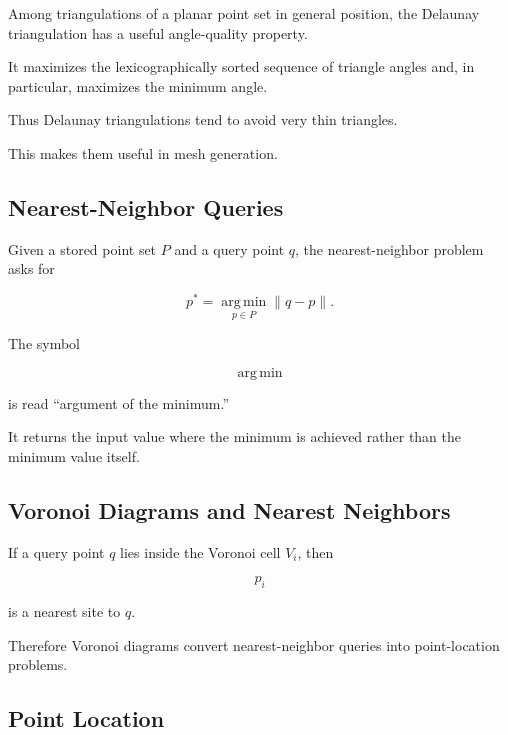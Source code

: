 Among triangulations of a planar point set in general position, the Delaunay
triangulation has a useful angle-quality property.

It maximizes the lexicographically sorted sequence of triangle angles and,
in particular, maximizes the minimum angle.

Thus Delaunay triangulations tend to avoid very thin triangles.

This makes them useful in mesh generation.

\subsection{Nearest-Neighbor Queries}
\label{subsec:nearest-neighbor-query}

Given a stored point set \(P\) and a query point \(q\), the nearest-neighbor
problem asks for

\[
\boxed{
p^*
=
\operatorname*{arg\,min}_{p\in P}
\|q-p\|.
}
\]

The symbol

\[
\operatorname*{arg\,min}
\]

is read ``argument of the minimum.''

It returns the input value where the minimum is achieved rather than the
minimum value itself.

\subsection{Voronoi Diagrams and Nearest Neighbors}
\label{subsec:voronoi-nearest-neighbor}

If a query point \(q\) lies inside the Voronoi cell \(V_i\), then

\[
\boxed{
p_i
}
\]

is a nearest site to \(q\).

Therefore Voronoi diagrams convert nearest-neighbor queries into
point-location problems.

\subsection{Point Location}
\label{subsec:point-location}

